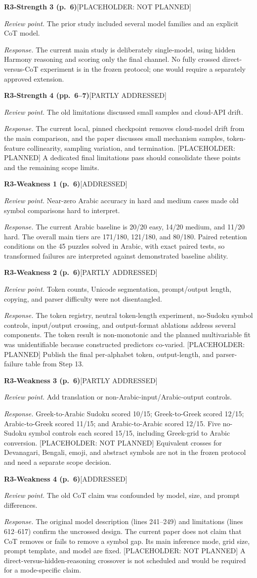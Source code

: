 \documentclass[10pt,a4paper]{article}
\newcommand{\Done}{\textcolor{done}{\textsf{[ADDRESSED]}}}
\newcommand{\Partial}{\textcolor{pending}{\textsf{[PARTLY ADDRESSED]}}}
\newcommand{\Planned}{\textcolor{pending}{\textsf{[PLACEHOLDER: PLANNED]}}}
\newcommand{\Open}{\textcolor{open}{\textsf{[PLACEHOLDER: NOT PLANNED]}}}
\newcommand{\itemresponse}[4]{%
  \Needspace{5\baselineskip}%
  \par\vspace{0.65\baselineskip}%
  \noindent\textbf{#1}\quad #2\par
  \noindent\emph{Review point.} #3\par
  \noindent\emph{Response.} #4\par
}
\begin{document}
\itemresponse{R3-Strength 3 (p.~6)}{\Open}{The prior study included several model families and an explicit CoT model.}{The current main study is deliberately single-model, using hidden Harmony reasoning and scoring only the final channel. No fully crossed direct-versus-CoT experiment is in the frozen protocol; one would require a separately approved extension.}

\itemresponse{R3-Strength 4 (pp.~6--7)}{\Partial}{The old limitations discussed small samples and cloud-API drift.}{The current local, pinned checkpoint removes cloud-model drift from the main comparison, and the paper discusses small mechanism samples, token-feature collinearity, sampling variation, and termination. \Planned{} A dedicated final limitations pass should consolidate these points and the remaining scope limits.}

\itemresponse{R3-Weakness 1 (p.~6)}{\Done}{Near-zero Arabic accuracy in hard and medium cases made old symbol comparisons hard to interpret.}{The current Arabic baseline is 20/20 easy, 14/20 medium, and 11/20 hard. The overall main tiers are 171/180, 121/180, and 80/180. Paired retention conditions on the 45 puzzles solved in Arabic, with exact paired tests, so transformed failures are interpreted against demonstrated baseline ability.}

\itemresponse{R3-Weakness 2 (p.~6)}{\Partial}{Token counts, Unicode segmentation, prompt/output length, copying, and parser difficulty were not disentangled.}{The token registry, neutral token-length experiment, no-Sudoku symbol controls, input/output crossing, and output-format ablations address several components. The token result is non-monotonic and the planned multivariable fit was unidentifiable because constructed predictors co-varied. \Planned{} Publish the final per-alphabet token, output-length, and parser-failure table from Step 13.}

\itemresponse{R3-Weakness 3 (p.~6)}{\Partial}{Add translation or non-Arabic-input/Arabic-output controls.}{Greek-to-Arabic Sudoku scored 10/15; Greek-to-Greek scored 12/15; Arabic-to-Greek scored 11/15; and Arabic-to-Arabic scored 12/15. Five no-Sudoku symbol controls each scored 15/15, including Greek-grid to Arabic conversion. \Open{} Equivalent crosses for Devanagari, Bengali, emoji, and abstract symbols are not in the frozen protocol and need a separate scope decision.}

\itemresponse{R3-Weakness 4 (p.~6)}{\Done}{The old CoT claim was confounded by model, size, and prompt differences.}{The original model description (lines 241--249) and limitations (lines 612--617) confirm the uncrossed design. The current paper does not claim that CoT removes or fails to remove a symbol gap. Its main inference mode, grid size, prompt template, and model are fixed. \Open{} A direct-versus-hidden-reasoning crossover is not scheduled and would be required for a mode-specific claim.}
\end{document}
